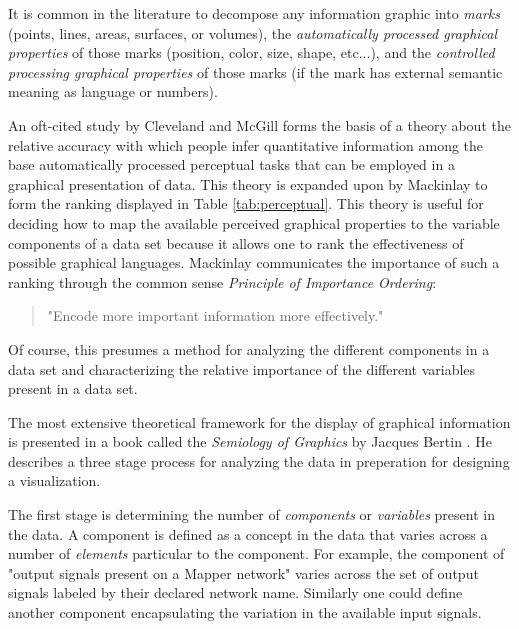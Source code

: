 It is common in the literature to decompose any information graphic into \emph{marks} (points, lines, areas, surfaces, or volumes), the \emph{automatically processed graphical properties} of those marks (position, color, size, shape, etc...), and the \emph{controlled processing graphical properties} of those marks (if the mark has external semantic meaning as language or numbers). 

An oft-cited study by Cleveland and McGill \cite{cleveland1984} forms the basis of a theory about the relative accuracy with which people infer quantitative information among the base automatically processed perceptual tasks that can be employed in a graphical presentation of data. This theory is expanded upon by Mackinlay \cite{jock1986} to form the ranking displayed in Table \ref{tab:perceptual}. This theory is useful for deciding how to map the available perceived graphical properties to the variable components of a data set because it allows one to rank the effectiveness of possible graphical languages. Mackinlay communicates the importance of such a ranking through the common sense \emph{Principle of Importance Ordering}:

\begin{quote}
"Encode more important information more effectively." \cite{jock1986}
\end{quote}

\begin{comment}
The Structure of the Information Visualization Design Space, Section 2 
controlled vs. automatic processing
connection

Visual Information Seeking: Tight Coupling of Dynamic Query Filters with Starfield Displays
\end{comment}

Of course, this presumes a method for analyzing the different components in a data set and characterizing the relative importance of the different variables present in a data set.

The most extensive theoretical framework for the display of graphical information is presented in a book called the \emph{Semiology of Graphics} by Jacques Bertin \cite{semiology1983}. He describes a three stage process for analyzing the data in preperation for designing a visualization.

The first stage is determining the number of \emph{components} or \emph{variables} present in the data. A component is defined as a concept in the data that varies across a number of \emph{elements} particular to the component. For example, the component of "output signals present on a Mapper network" varies across the set of output signals labeled by their declared network name. Similarly one could define another component encapsulating the variation in the available input signals. 

